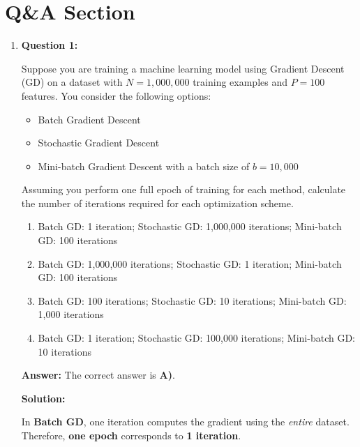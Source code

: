 \documentclass{article}
\begin{document}



\section{Q\&A Section}

\begin{enumerate}

\item \textbf{Question 1:}

Suppose you are training a machine learning model using Gradient Descent (GD) on a dataset with \( N = 1{,}000{,}000 \) training examples and \( P = 100 \) features. You consider the following options:
\begin{itemize}
    \item Batch Gradient Descent
    \item Stochastic Gradient Descent
    \item Mini-batch Gradient Descent with a batch size of \( b = 10{,}000 \)
\end{itemize}
Assuming you perform one full epoch of training for each method, calculate the number of iterations required for each optimization scheme.

\begin{enumerate}
    \item Batch GD: 1 iteration; Stochastic GD: 1{,}000{,}000 iterations; Mini-batch GD: 100 iterations
    \item Batch GD: 1{,}000{,}000 iterations; Stochastic GD: 1 iteration; Mini-batch GD: 100 iterations
    \item Batch GD: 100 iterations; Stochastic GD: 10 iterations; Mini-batch GD: 1{,}000 iterations
    \item Batch GD: 1 iteration; Stochastic GD: 100{,}000 iterations; Mini-batch GD: 10 iterations
\end{enumerate}

\textbf{Answer:} The correct answer is \textbf{A)}.

\textbf{Solution:}

In \textbf{Batch GD}, one iteration computes the gradient using the \emph{entire} dataset. Therefore, \textbf{one epoch} corresponds to \textbf{1 iteration}.


\end{enumerate}
\end{document}
